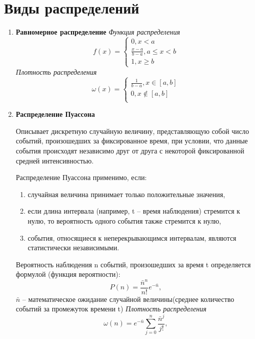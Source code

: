 \documentclass[14pt,a4paper]{article}
\begin{document}
\section{Виды распределений}
\begin{enumerate}
    \item \textbf{Равномерное распределение}
    \textit{Функция распределения}
    \begin{equation}
        f(x) = \begin{cases}
            0, x < a \\
            \frac{x-a}{b-a}, a \leqslant  x < b \\
            1, x \geqslant  b
        \end{cases}
    \end{equation}
    \textit{Плотность распределения}
    \begin{equation}
        \omega(x) = \begin{cases}
            \frac{1}{b-a}, x \in [a,b] \\
            0, x \notin [a,b]\\
        \end{cases}
    \end{equation}
    \item \textbf{Распределение Пуассона}
    
    Описывает дискретную случайную величину, представляющую собой число событий, произошедших за фиксированное время, при условии, что данные события происходят независимо друг от друга с некоторой фиксированной средней интенсивностью. 

    Распределение Пуассона применимо, если:
    \begin{enumerate}
        \item случайная величина принимает только положительные значения, 
        \item если длина интервала (например, t – время наблюдения) стремится к нулю, то вероятность одного события также стремится к нулю,
        \item события, относящиеся к неперекрывающимся интервалам, являются статистически независимыми.
    \end{enumerate} 
    Вероятность наблюдения n событий, произошедших за время t определяется формулой (функция вероятности):
    \begin{equation}
        P(n) = \frac{{\bar{n}}^n}{n!}e^{-\bar{n}},
    \end{equation}
    $\bar{n}$ – математическое ожидание случайной величины(среднее количество событий за  промежуток времени t)
    \textit{Плотность распределения}
    \begin{equation}
        \omega(n) = e^{-\bar{n}}\sum\limits_{j=0}^n \frac{\bar{n}^j}{j!},
    \end{equation}


\end{enumerate}
\end{document}
